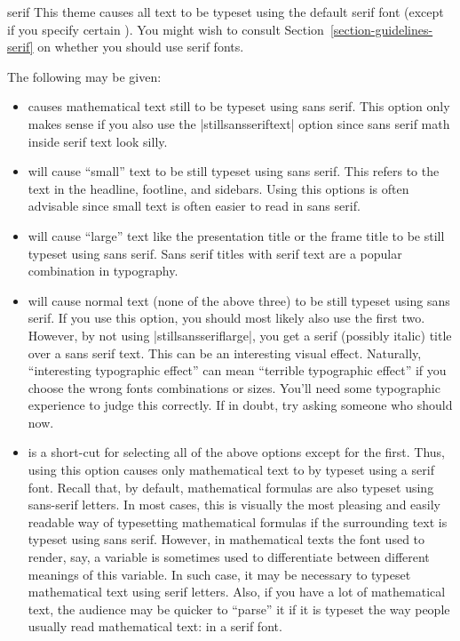 \begin{fontthemeexample}{serif}
  This theme causes all text to be typeset using the default serif font
  (except if you specify certain ). You might wish to
  consult Section~\ref{section-guidelines-serif} on whether you should
  use serif fonts.

  The following  may be given:
  \begin{itemize}
  \item
    causes mathematical text still to be typeset using sans
    serif. This option only makes sense if you also use the
    |stillsansseriftext| option since sans serif math inside serif
    text look silly.
  \item
    will cause ``small'' text to be still typeset using sans
    serif. This refers to the text in the headline, footline, and
    sidebars.  Using this options is often advisable since small text
    is often easier to read in sans serif.
  \item
    will cause ``large'' text like the presentation title or the frame
    title to be still typeset using sans serif. Sans serif titles with
    serif text are a popular combination in typography.
  \item
    will cause normal text (none of the above three) to be still
    typeset using sans serif. If you use this option, you should most
    likely also use the first two. However, by not using
    |stillsansseriflarge|, you get a serif (possibly italic) title
    over a sans serif text. This can be an interesting visual
    effect. Naturally, ``interesting typographic effect'' can mean
    ``terrible typographic effect'' if you choose the wrong fonts
    combinations or sizes. You'll need some typographic experience to
    judge this correctly. If in doubt, try asking someone who should
    now.
  \item
    is a short-cut for selecting all of the above options except for
    the first. Thus, using this option causes only mathematical text
    to by typeset using a serif font. Recall that, by default,
    mathematical formulas are also typeset using sans-serif
    letters. In most cases, this is visually the most pleasing and
    easily readable way of typesetting mathematical formulas if the
    surrounding text is typeset using sans serif. However,
    in mathematical texts the font used to render, say, a variable is
    sometimes used to differentiate between different meanings of this
    variable. In such case, it may be necessary to typeset
    mathematical text using serif letters. Also, if you have a lot of
    mathematical text, the audience may be quicker to ``parse'' it if
    it is typeset the way people usually read mathematical text: in a
    serif font.
  \end{itemize}
\end{fontthemeexample}



